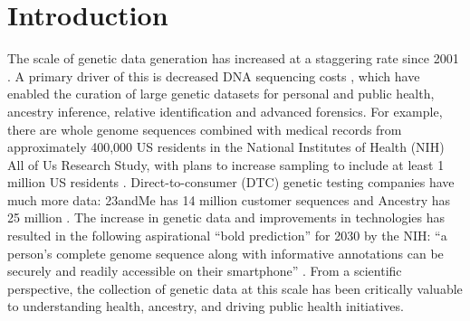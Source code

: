 \section{Introduction}





The scale of genetic data generation has increased at a staggering rate since 2001 \cite{bick_genomic_2024, bycroft_uk_2018, loos_15_2020}. A primary driver of this is decreased DNA sequencing costs \cite{wetterstrand_dna_2023}, which have enabled the curation of large genetic datasets for personal and public health, ancestry inference, relative identification and advanced forensics. For example, there are whole genome sequences combined with medical records from approximately 400,000 US residents in the National Institutes of Health (NIH) All of Us Research Study, with plans to increase sampling to include at least 1 million US residents \cite{nih_all_2024}. Direct-to-consumer (DTC) genetic testing companies have much more data: 23andMe has 14 million customer sequences \cite{23andme_reports_2023} and Ancestry has 25 million \cite{ancestry_company_facts_2025}. The increase in genetic data and improvements in technologies has resulted in the following aspirational ``bold prediction'' for 2030 by the NIH: ``a person’s complete genome sequence along with informative annotations can be securely and readily accessible on their smartphone'' \cite{green_strategic_2020}. 
From a scientific perspective, the collection of genetic data at this scale has been critically valuable to understanding health, ancestry, and driving public health initiatives.


